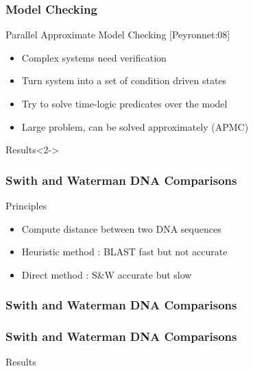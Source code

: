 \frame
{
  \frametitle{Model Checking}
  \begin{block}{Parallel Approximate Model Checking [Peyronnet:08]}
  \begin{itemize}
  \footnotesize
  \item Complex systems need verification
  \item Turn system into a set of condition driven states
  \item Try to solve time-logic predicates over the model
  \item Large problem, can be solved approximately (APMC)
  \end{itemize}
  \end{block}{}

  \begin{block}{Results}<2->
  \end{block}{}

}

\frame
{
  \frametitle{Swith and Waterman DNA Comparisons}
  \begin{block}{Principles}
  \begin{itemize}
  \footnotesize
  \item Compute distance between two DNA sequences
  \item Heuristic method : BLAST fast but not accurate
  \item Direct method : S\&W accurate but slow
  \end{itemize}
  \end{block}{}
}
\frame
{
  \frametitle{Swith and Waterman DNA Comparisons}
\begin{center}\end{center}
}
\frame
{
  \frametitle{Swith and Waterman DNA Comparisons}
  \begin{block}{Results}
  \end{block}{}
}
